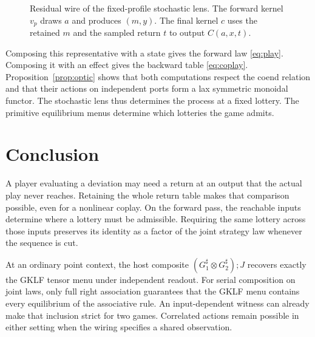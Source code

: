 \documentclass[11pt,a4paper]{article}
\theoremstyle{definition}
\begin{document}
\begin{figure}[!htbp]
    \centering\small
    \caption{Residual wire of the fixed-profile stochastic lens. The forward kernel $v_p$ draws $a$ and produces $(m,y)$. The final kernel $c$ uses the retained $m$ and the sampled return $t$ to output $C(a,x,t)$.}\label{fig:residual}
\end{figure}

Composing this representative with a state gives the forward law \eqref{eq:play}. Composing it with an effect gives the backward table \eqref{eq:coplay}. Proposition~\ref{prop:optic} shows that both computations respect the coend relation and that their actions on independent ports form a lax symmetric monoidal functor. The stochastic lens thus determines the process at a fixed lottery. The primitive equilibrium menus determine which lotteries the game admits.

\section*{Conclusion}

A player evaluating a deviation may need a return at an output that the actual play never reaches. Retaining the whole return table makes that comparison possible, even for a nonlinear coplay. On the forward pass, the reachable inputs determine where a lottery must be admissible. Requiring the same lottery across those inputs preserves its identity as a factor of the joint strategy law whenever the sequence is cut.

At an ordinary point context, the host composite $(G_1^\sharp\otimes G_2^\sharp);J$ recovers exactly the GKLF tensor menu under independent readout. For serial composition on joint laws, only full right association guarantees that the GKLF menu contains every equilibrium of the associative rule. An input-dependent witness can already make that inclusion strict for two games. Correlated actions remain possible in either setting when the wiring specifies a shared observation.
\end{document}
